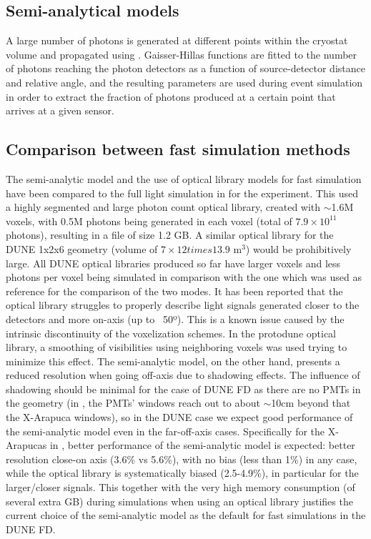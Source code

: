 \documentclass[../main-v1.tex]{subfiles}
\begin{document}
\subsection{Semi-analytical models}
A large number of photons is generated at different points within the cryostat volume and propagated using . Gaisser-Hillas functions are fitted to the number of photons reaching the photon detectors as a function of source-detector distance and relative angle, and the resulting parameters are used during event simulation in order to extract the fraction of photons produced at a certain point that arrives at a given sensor.
 
\subsection{Comparison between fast simulation methods}
The semi-analytic model and the use of  optical library models for fast simulation have been compared to the full light simulation in  for the    experiment. This used a highly segmented and large photon count optical library, created with $\sim$1.6M voxels, with 0.5M photons being generated in each voxel (total of $7.9 \times  10^{11}$ photons), resulting in a file of size 1.2 GB. A similar optical library for the DUNE 1x2x6 geometry (volume of $7 \times 12 times 13.9$ m$^3$) would be prohibitively large.
All DUNE optical libraries produced so far have larger voxels and less photons per voxel being simulated in comparison with the    one which was used as reference for the comparison of the two modes. It has been reported that the optical library struggles to properly describe light signals generated closer to the detectors and more on-axis (up to ~50º). This is a known issue caused by the intrinsic discontinuity of the voxelization schemes. In the protodune optical library, a smoothing of visibilities using neighboring voxels was used trying to minimize this effect.
The semi-analytic model, on the other hand, presents a reduced resolution when going off-axis due to shadowing effects. The influence of shadowing should be minimal for the case of DUNE FD as there are no PMTs in the geometry (in   , the PMTs’ windows reach out to about $\sim$10cm beyond that the X-Arapuca windows), so in the DUNE case we expect  good performance of the semi-analytic model even in the far-off-axis cases.
Specifically for the X-Arapucas in   ,  better performance of the semi-analytic model is expected: better resolution close-on axis (3.6\% vs 5.6\%), with no bias (less than 1\%) in any case, while the optical library is systematically biased (2.5-4.9\%), in particular for the larger/closer signals. This together with the very high memory consumption (of several extra GB) during simulations when using an optical library justifies the current choice of the semi-analytic model as the default for fast simulations in the DUNE FD.
\end{document}
